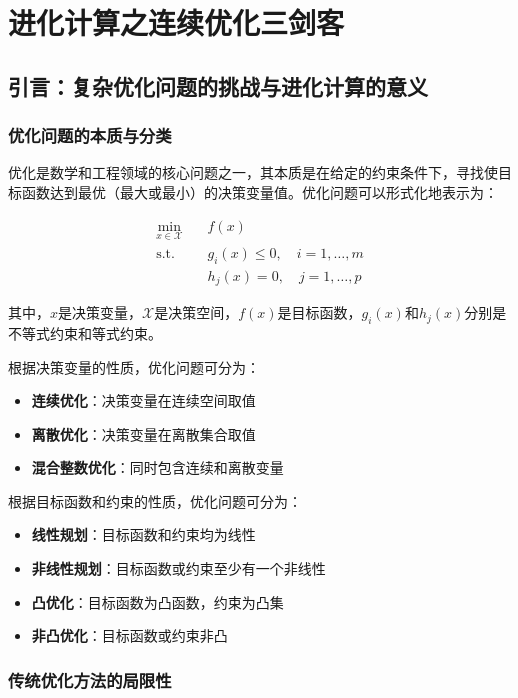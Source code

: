 \chapter{进化计算之连续优化三剑客}
\section{引言：复杂优化问题的挑战与进化计算的意义}

\subsection{优化问题的本质与分类}

优化是数学和工程领域的核心问题之一，其本质是在给定的约束条件下，寻找使目标函数达到最优（最大或最小）的决策变量值。优化问题可以形式化地表示为：

\begin{align*}
\min_{x \in \mathcal{X}} &\quad f(x) \\
\text{s.t.} &\quad g_i(x) \leq 0, \quad i = 1, \dots, m \\
&\quad h_j(x) = 0, \quad j = 1, \dots, p
\end{align*}

其中，$x$是决策变量，$\mathcal{X}$是决策空间，$f(x)$是目标函数，$g_i(x)$和$h_j(x)$分别是不等式约束和等式约束。

根据决策变量的性质，优化问题可分为：
\begin{itemize}
    \item \textbf{连续优化}：决策变量在连续空间取值
    \item \textbf{离散优化}：决策变量在离散集合取值
    \item \textbf{混合整数优化}：同时包含连续和离散变量
\end{itemize}

根据目标函数和约束的性质，优化问题可分为：
\begin{itemize}
    \item \textbf{线性规划}：目标函数和约束均为线性
    \item \textbf{非线性规划}：目标函数或约束至少有一个非线性
    \item \textbf{凸优化}：目标函数为凸函数，约束为凸集
    \item \textbf{非凸优化}：目标函数或约束非凸
\end{itemize}

\subsection{传统优化方法的局限性}

